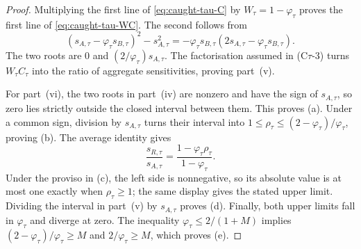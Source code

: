 \begin{proof}
Multiplying the first line of \eqref{eq:caught-tau-C} by
$W_\tau=1-\varphi_\tau$ proves the first line of \eqref{eq:caught-tau-WC}. The second follows from
\[
(s_{A,\tau}-\varphi_\tau s_{B,\tau})^2-s_{A,\tau}^2
=-\varphi_\tau s_{B,\tau}(2s_{A,\tau}-\varphi_\tau s_{B,\tau}).
\]
The two roots are $0$ and $(2/\varphi_\tau)s_{A,\tau}$. The factorisation assumed in
(C$\tau$-3) turns $W_\tau C_\tau$ into the ratio of aggregate sensitivities, proving part~(v).

For part~(vi), the two roots in part~(iv) are nonzero and have the sign of $s_{A,\tau}$, so zero
lies strictly outside the closed interval between them. This proves (a). Under a common sign,
division by $s_{A,\tau}$ turns their interval into
$1\le\rho_\tau\le(2-\varphi_\tau)/\varphi_\tau$, proving (b). The average identity gives
\[
\frac{s_{R,\tau}}{s_{A,\tau}}
=\frac{1-\varphi_\tau\rho_\tau}{1-\varphi_\tau}.
\]
Under the proviso in (c), the left side is nonnegative, so its absolute value is at most one exactly
when $\rho_\tau\ge1$; the same display gives the stated upper limit. Dividing the interval in
part~(v) by $s_{A,\tau}$ proves (d). Finally, both upper limits fall in $\varphi_\tau$ and diverge at
zero. The inequality $\varphi_\tau\le2/(1+M)$ implies
$(2-\varphi_\tau)/\varphi_\tau\ge M$ and $2/\varphi_\tau\ge M$, which proves (e).
\end{proof}


